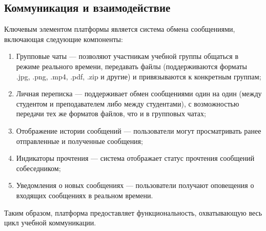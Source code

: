 \subsection{Коммуникация и взаимодействие}

Ключевым элементом платформы является система обмена сообщениями, включающая следующие компоненты:

\begin{enumerate}
  \item Групповые чаты --- позволяют участникам учебной группы общаться в режиме реального времени, передавать файлы (поддерживаются форматы .jpg, .png, .mp4, .pdf, .zip и другие) и привязываются к конкретным группам;
  \item Личная переписка --- поддерживает обмен сообщениями один на один (между студентом и преподавателем либо между студентами), с возможностью передачи тех же форматов файлов, что и в групповых чатах;
  \item Отображение истории сообщений --- пользователи могут просматривать ранее отправленные и полученные сообщения;
  \item Индикаторы прочтения --- система отображает статус прочтения сообщений собеседником;
  \item Уведомления о новых сообщениях --- пользователи получают оповещения о входящих сообщениях в реальном времени.
\end{enumerate}

Таким образом, платформа предоставляет функциональность, охватывающую весь цикл учебной коммуникации.
